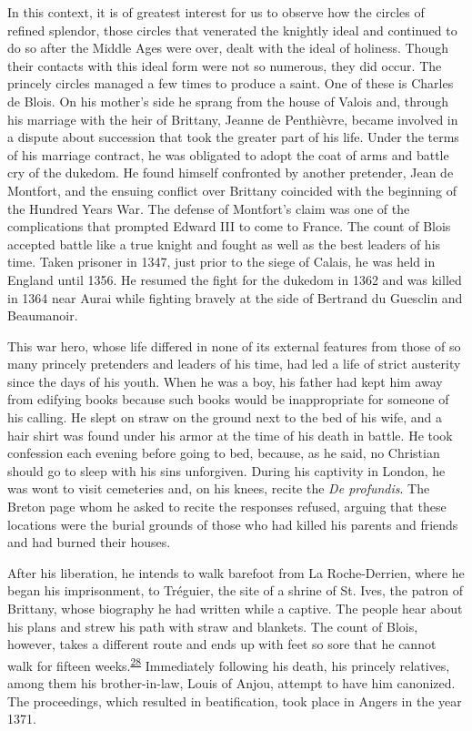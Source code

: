 In this context, it is of greatest interest for us to observe how the
circles of refined splendor, those circles that venerated the knightly
ideal and continued to do so after the Middle Ages were over, dealt with
the ideal of holiness. Though their contacts with this ideal form were
not so numerous, they did occur. The princely circles managed a few
times to produce a saint. One of these is Charles de Blois. On his
mother's side he sprang from the house of Valois and, through his
marriage with the heir of Brittany, Jeanne de Penthièvre, became
involved in a dispute about succession that took the greater part of his
life. Under the terms of his marriage contract, he was obligated to
adopt the coat of arms and battle cry of the dukedom. He found himself
confronted by another pretender, Jean de Montfort, and the ensuing
conflict over Brittany coincided with the beginning of the Hundred Years
War. The defense of Montfort's claim was one of the complications that
prompted Edward III to come to France. The count of Blois accepted
battle like a true knight and fought as well as the best leaders of his
time. Taken prisoner in 1347, just prior to the siege of Calais, he was
held in England until 1356. He resumed the fight for the dukedom in 1362
and was killed in 1364 near Aurai while fighting bravely at the side of
Bertrand du Guesclin and Beaumanoir.

This war hero, whose life differed in none of its external features from
those of so many princely pretenders and leaders of his time, had led a
life of strict austerity since the days of his youth. When he was a boy,
his father had kept him away from edifying books
\protect\hypertarget{14_Chapter_Seven__THE_PIOUS_PERSONA.xhtmlux5cux23page_212}{}{}because
such books would be inappropriate for someone of his calling. He slept
on straw on the ground next to the bed of his wife, and a hair shirt was
found under his armor at the time of his death in battle. He took
confession each evening before going to bed, because, as he said, no
Christian should go to sleep with his sins unforgiven. During his
captivity in London, he was wont to visit cemeteries and, on his knees,
recite the \emph{De profundis}. The Breton page whom he asked to recite
the responses refused, arguing that these locations were the burial
grounds of those who had killed his parents and friends and had burned
their houses.

After his liberation, he intends to walk barefoot from La Roche-Derrien,
where he began his imprisonment, to Tréguier, the site of a shrine of
St. Ives, the patron of Brittany, whose biography he had written while a
captive. The people hear about his plans and strew his path with straw
and blankets. The count of Blois, however, takes a different route and
ends up with feet so sore that he cannot walk for fifteen
weeks.\textsuperscript{\protect\hypertarget{14_Chapter_Seven__THE_PIOUS_PERSONA.xhtmlux5cux23id_968}{\protect\hyperlink{23_NOTES.xhtmlux5cux23id_969}{28}}}
Immediately following his death, his princely relatives, among them his
brother-in-law, Louis of Anjou, attempt to have him canonized. The
proceedings, which resulted in beatification, took place in Angers in
the year 1371.

